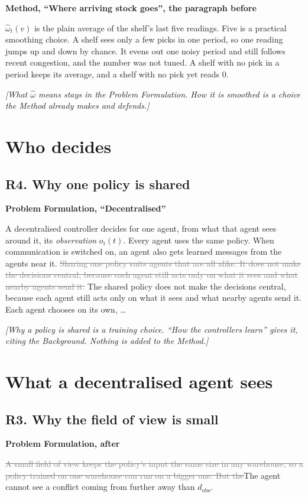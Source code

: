 \documentclass[11pt,a4paper]{article}
\newcommand{\new}[1]{\textcolor{newc}{#1}}
\newcommand{\old}[1]{\textcolor{gray}{\sout{#1}}}
\newcommand{\note}[1]{{\small\itshape [#1]}}
\newcommand{\lab}[1]{\textsf{\footnotesize\detokenize{#1}}}
\newcommand{\where}[1]{\par\textbf{#1}\par}
\begin{document}
\where{Method, ``Where arriving stock goes'', the paragraph before \lab{eq:standstill}}
$\hat\omega_t(v)$ is the plain average of the shelf's last five readings.
Five is a practical smoothing choice. \new{A shelf sees only a few picks in
one period, so one reading jumps up and down by chance.} It evens out one
noisy period and still follows recent congestion, and the number was not
tuned. A shelf with no pick in a period keeps its average\new{, and a shelf
with no pick yet reads 0}.

\note{What $\hat\omega$ means stays in the Problem Formulation. How it is
smoothed is a choice the Method already makes and defends.}

\section*{Who decides}

\subsection*{R4. Why one policy is shared}
\where{Problem Formulation, ``Decentralised''}
A decentralised controller decides for one agent, from what that agent sees
around it, its \emph{observation} $o_i(t)$. Every agent uses the same
policy. When communication is switched on, an agent also gets learned
messages from the agents near it. \old{Sharing one policy suits agents that
are all alike. It does not make the decisions central, because each agent
still acts only on what it sees and what nearby agents send it.} \new{The
shared policy does not make the decisions central, because each agent still
acts only on what it sees and what nearby agents send it.} Each agent
chooses on its own, \dots

\note{Why a policy is shared is a training choice. ``How the controllers
learn'' gives it, citing the Background. Nothing is added to the Method.}

\section*{What a decentralised agent sees}

\subsection*{R3. Why the field of view is small}
\where{Problem Formulation, after \lab{fig:observation}}
\old{A small field of view keeps the policy's input the same size in any
warehouse, so a policy trained on one warehouse can run on a bigger one.
But the}\new{The} agent cannot see a conflict coming from further away than
$d_{\mathrm{obs}}$.
\end{document}
